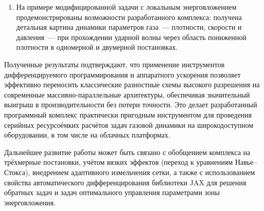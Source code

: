 \documentclass[a4paper,14pt]{extarticle}
\theoremstyle{theorem}
\theoremstyle{lemma}
\begin{document}
\begin{enumerate}
    \item На примере модифицированной задачи с локальным энерговложением
    продемонстрированы возможности разработанного комплекса: получена детальная
    картина динамики параметров газа~--- плотности, скорости и давления~--- при
    прохождении ударной волны через область пониженной плотности в одномерной и
    двумерной постановках.
\end{enumerate}

Полученные результаты подтверждают, что применение инструментов дифференцируемого
программирования и аппаратного ускорения позволяет эффективно переносить
классические разностные схемы высокого разрешения на современные массивно-параллельные
архитектуры, обеспечивая значительный выигрыш в производительности без потери
точности. Это делает разработанный программный комплекс практически пригодным
инструментом для проведения серийных ресурсоёмких расчётов задач газовой динамики
на широкодоступном оборудовании, в том числе на облачных платформах.

Дальнейшее развитие работы может быть связано с обобщением комплекса на трёхмерные
постановки, учётом вязких эффектов (переход к уравнениям Навье--Стокса), внедрением
адаптивного измельчения сетки, а также с использованием свойства автоматического
дифференцирования библиотеки JAX для решения обратных задач и задач оптимального
управления параметрами зоны энерговложения.
\end{document}
